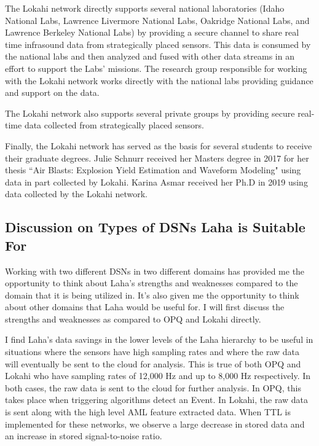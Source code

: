 The Lokahi network directly supports several national laboratories (Idaho National Labs, Lawrence Livermore National Labs, Oakridge National Labs, and Lawrence Berkeley National Labs) by providing a secure channel to share real time infrasound data from strategically placed sensors. This data is consumed by the national labs and then analyzed and fused with other data streams in an effort to support the Labs' missions. The research group responsible for working with the Lokahi network works directly with the national labs providing guidance and support on the data.

The Lokahi network also supports several private groups by providing secure real-time data collected from strategically placed sensors.

Finally, the Lokahi network has served as the basis for several students to receive their graduate degrees. Julie Schnurr received her Masters degree in 2017 for her thesis ``Air Blasts: Explosion Yield Estimation and Waveform Modeling"\cite{julie} using data in part collected by Lokahi. Karina Asmar received her Ph.D\cite{asmar19} in 2019 using data collected by the Lokahi network.

\subsection{Discussion on Types of DSNs Laha is Suitable For}\label{subsec:discussion-on-types-of-dsns-laha-is-suitable-for}

Working with two different DSNs in two different domains has provided me the opportunity to think about Laha's strengths and weaknesses compared to the domain that it is being utilized in. It's also given me the opportunity to think about other domains that Laha would be useful for. I will first discuss the strengths and weaknesses as compared to OPQ and Lokahi directly.

I find Laha's data savings in the lower levels of the Laha hierarchy to be useful in situations where the sensors have high sampling rates and where the raw data will eventually be sent to the cloud for analysis. This is true of both OPQ and Lokahi who have sampling rates of 12,000 Hz and up to 8,000 Hz respectively. In both cases, the raw data is sent to the cloud for further analysis. In OPQ, this takes place when triggering algorithms detect an Event. In Lokahi, the raw data is sent along with the high level AML feature extracted data. When TTL is implemented for these networks, we observe a large decrease in stored data and an increase in stored signal-to-noise ratio.

